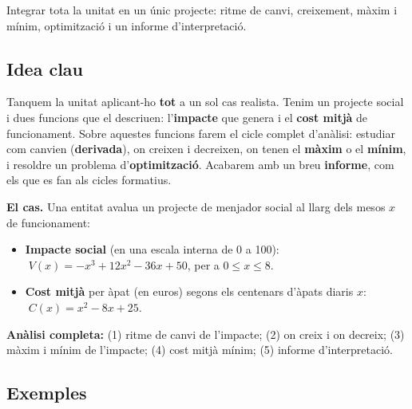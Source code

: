 %
{Integrar tota la unitat en un únic projecte: ritme de canvi, creixement, màxim i mínim, optimització i un informe d'interpretació.}

\subsection{Idea clau}

Tanquem la unitat aplicant-ho \textbf{tot} a un sol cas realista. Tenim un projecte
social i dues funcions que el descriuen: l'\textbf{impacte} que genera i el \textbf{cost
mitjà} de funcionament. Sobre aquestes funcions farem el cicle complet d'anàlisi:
estudiar com canvien (\textbf{derivada}), on creixen i decreixen, on tenen el
\textbf{màxim} o el \textbf{mínim}, i resoldre un problema d'\textbf{optimització}.
Acabarem amb un breu \textbf{informe}, com els que es fan als cicles formatius.

\begin{idea}
\textbf{El cas.} Una entitat avalua un projecte de menjador social al llarg dels mesos
$x$ de funcionament:
\begin{itemize}[leftmargin=1.4em, itemsep=2pt]
  \item \textbf{Impacte social} (en una escala interna de 0 a 100):
        $\;V(x)=-x^3+12x^2-36x+50$, per a $0\le x\le 8$.
  \item \textbf{Cost mitjà} per àpat (en euros) segons els centenars d'àpats diaris $x$:
        $\;C(x)=x^2-8x+25$.
\end{itemize}
\textbf{Anàlisi completa:} (1) ritme de canvi de l'impacte; (2) on creix i on decreix;
(3) màxim i mínim de l'impacte; (4) cost mitjà mínim; (5) informe d'interpretació.
\end{idea}

\subsection{Exemples}

